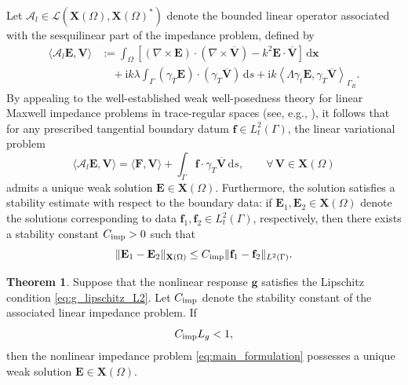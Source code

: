 \documentclass[12pt,reqno]{amsart}
\theoremstyle{definition}
\newtheorem{theo}{Theorem}[section]
\numberwithin{equation}{section}
\begin{document}
Let $\mathscr {A}_l \in \mathcal{L}(\mathbf{X}(\Omega), \mathbf{X}(\Omega)^*)$ denote the bounded linear operator associated with the sesquilinear part of the impedance problem, defined by
\begin{equation}
\label{eq:Al_definition}
\begin{aligned}
\langle \mathscr {A}_l \mathbf{E}, \mathbf{V} \rangle 
&:= \int_\Omega \left[ (\nabla \times \mathbf{E}) \cdot (\nabla \times \overline{\mathbf{V}}) - k^2 \mathbf{E} \cdot \overline{\mathbf{V}} \right] \, \mathrm{d}\boldsymbol {x} \\
&\quad + \mathrm{i} k \lambda \int_\Gamma (\gamma_T \mathbf{E}) \cdot (\gamma_T \overline{\mathbf{V}}) \, \mathrm{d}s + \mathrm{i} k \left\langle \Lambda \gamma_t \mathbf{E}, \gamma_T \overline{\mathbf{V}} \right\rangle_{\Gamma_R}.
\end{aligned}
\end{equation}
By appealing to the well-established weak well-posedness theory for linear Maxwell impedance problems in trace-regular spaces (see, e.g., \cite[Theorem 4.17]{Monk2003}), it follows that for any prescribed tangential boundary datum $\mathbf{f} \in L_t^2(\Gamma)$, the linear variational problem
\begin{equation}
\label{eq:linear_impedance_data_problem}
\langle \mathscr {A}_l \mathbf{E}, \mathbf{V} \rangle = \langle \mathbf{F}, \mathbf{V} \rangle + \int_\Gamma \mathbf{f} \cdot \gamma_T \overline{\mathbf{V}} \, \mathrm{d}s, \qquad \forall \, \mathbf{V} \in \mathbf{X}(\Omega)
\end{equation}
admits a unique weak solution $\mathbf{E} \in \mathbf{X}(\Omega)$. Furthermore, the solution satisfies a stability estimate with respect to the boundary data: if $\mathbf{E}_1, \mathbf{E}_2 \in \mathbf{X}(\Omega)$ denote the solutions corresponding to data $\mathbf{f}_1, \mathbf{f}_2 \in L_t^2(\Gamma)$, respectively, then there exists a stability constant $C_{\rm imp} > 0$ such that
\begin{equation}
\label{eq:linear_stability}
\|\mathbf{E}_1 - \mathbf{E}_2\|_{\mathbf{X}(\Omega)} \le C_{\rm imp} \|\mathbf{f}_1 - \mathbf{f}_2\|_{L^2(\Gamma)}.
\end{equation}


\begin{theo}
\label{th:existence_nibc}
Suppose that the nonlinear response $\mathbf{g}$ satisfies the Lipschitz condition \eqref{eq:g_lipschitz_L2}. Let $C_{\rm imp}$ denote the stability constant of the associated linear impedance problem. If 
\[
C_{\rm imp} L_g < 1,
\]
then the nonlinear impedance problem \eqref{eq:main_formulation} possesses a unique weak solution $\mathbf{E} \in \mathbf{X}(\Omega)$.
\end{theo}
\end{document}
